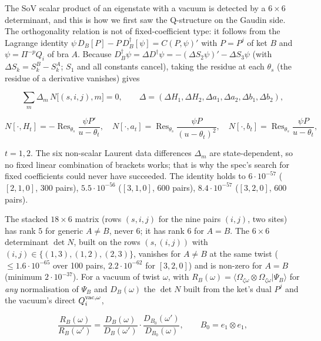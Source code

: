 \documentclass[11pt]{article}
\begin{document}
The SoV scalar product of an eigenstate with a vacuum is detected by a $6\times6$ determinant, and this is how we first saw the Q-structure on the Gaudin side.
The orthogonality relation is not of fixed-coefficient type: it follows from the Lagrange identity $\psi\,D_B[P]-P\,D_B^\dagger[\psi]=C(P,\psi)'$ with $P=P^j$ of ket $B$ and $\psi=\Pi^{-p}Q_i$ of bra $A$. Because $D_B^\dagger\psi=\Delta D^\dagger\psi=-(\Delta S_2\psi)'-\Delta S_3\psi$ (with $\Delta S_k=S_k^B-S_k^A$; $S_1$ and all constants cancel), taking the residue at each $\theta_s$ (the residue of a derivative vanishes) gives

\begin{equation}
\sum_m\Delta_m\,N\bigl[(s,i,j),m\bigr]=0,\qquad \Delta=(\Delta H_1,\Delta H_2,\Delta a_1,\Delta a_2,\Delta b_1,\Delta b_2),\label{eq:lagrange}
\end{equation}

\begin{equation}
N[\cdot,H_t]=-\mathop{\mathrm{Res}}_{\theta_s}\frac{\psi P'}{u-\theta_t},\quad N[\cdot,a_t]=\mathop{\mathrm{Res}}_{\theta_s}\frac{\psi P}{(u-\theta_t)^2},\quad N[\cdot,b_t]=\mathop{\mathrm{Res}}_{\theta_s}\frac{\psi P}{u-\theta_t},\label{eq:Ncols}
\end{equation}

$t=1,2$. The six non-scalar Laurent data differences $\Delta_m$ are state-dependent, so no fixed linear combination of brackets works; that is why the spec's search for fixed coefficients could never have succeeded.
The identity holds to $6\cdot10^{-57}$ ($[2,1,0]$, 300 pairs), $5.5\cdot10^{-56}$ ($[3,1,0]$, 600 pairs), $8.4\cdot10^{-57}$ ($[3,2,0]$, 600 pairs).

The stacked $18\times6$ matrix (rows $(s,i,j)$ for the nine pairs $(i,j)$, two sites) has rank $5$ for generic $A\ne B$, never $6$; it has rank $6$ for $A=B$. The $6\times6$ determinant $\det N$, built on the rows $(s,(i,j))$ with $(i,j)\in\{(1,3),(1,2),(2,3)\}$, vanishes for $A\neq B$ at the same twist ($\le1.6\cdot10^{-65}$ over 100 pairs, $2.2\cdot10^{-62}$ for $[3,2,0]$) and is non-zero for $A=B$ (minimum $2\cdot10^{-37}$).
For a vacuum of twist $\omega$, with $R_B(\omega)=\langle\Omega_{\zeta\omega}\otimes\Omega_{\zeta\omega}|\Psi_B\rangle$ for \emph{any} normalisation of $\Psi_B$ and $D_B(\omega)$ the $\det N$ built from the ket's dual $P^j$ and the vacuum's direct $Q_i^{\rm vac,\omega}$,

\begin{equation}
\frac{R_B(\omega)}{R_B(\omega')}=\frac{D_B(\omega)}{D_B(\omega')}\cdot\frac{D_{B_0}(\omega')}{D_{B_0}(\omega)},\qquad B_0=e_1\otimes e_1,\label{eq:ratio}
\end{equation}
\end{document}
